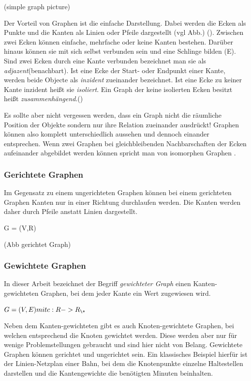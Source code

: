 \documentclass[10pt,a4paper]{article}
\begin{document}
(simple graph picture)

Der Vorteil von Graphen ist die einfache Darstellung. Dabei werden die Ecken als Punkte und die Kanten als Linien oder Pfeile dargestellt (vgl Abb.) (\cite[49]{kurt}). Zwischen zwei Ecken können einfache, mehrfache oder keine Kanten bestehen. Darüber hinaus können sie mit sich selbst verbunden sein und eine Schlinge bilden (E). Sind zwei Ecken durch eine Kante verbunden bezeichnet man sie als \textit{adjazent}(benachbart). Ist eine Ecke der Start- oder Endpunkt einer Kante, werden beide Objecte als \textit{inzident} zueinander bezeichnet. Ist eine Ecke zu keiner Kante inzident heißt sie \textit{isoliert}. Ein Graph der keine isolierten Ecken besitzt heißt \textit{zusammenhängend}.(\cite[4f]{theory})

Es sollte aber nicht vergessen werden, dass ein Graph nicht die räumliche Position der Objekte sondern nur ihre Relation zueinander ausdrückt! Graphen können also komplett unterschiedlich aussehen und dennoch einander entsprechen. Wenn zwei Graphen bei gleichbleibenden Nachbarschaften der Ecken aufeinander abgebildet werden können spricht man von isomorphen Graphen \cite[106]{theory}.

\subsubsection{Gerichtete Graphen}
Im Gegensatz zu einem ungerichteten Graphen können bei einem gerichteten Graphen Kanten nur in einer Richtung durchlaufen werden. Die Kanten werden daher durch Pfeile anstatt Linien dargestellt.

G = (V,R)

(Abb gerichtet Graph)

\subsubsection{Gewichtete Graphen}
In dieser Arbeit bezeichnet der Begriff \textit{gewichteter Graph} einen Kanten-gewichteten Graphen, bei dem jeder Kante ein Wert zugewiesen wird.

$G = (V,E) mit c: R -> R_{\+}$

Neben dem Kanten-gewichteten gibt es auch Knoten-gewichtete Graphen, bei welchen entsprechend die Knoten gewichtet werden. Diese werden aber nur für wenige Problemstellungen gebraucht und sind hier nicht von Belang. Gewichtete Graphen können gerichtet und ungerichtet sein. Ein klassisches Beispiel hierfür ist der Linien-Netzplan einer Bahn, bei dem die Knotenpunkte einzelne Haltestellen darstellen und die Kantengewichte die benötigten Minuten beinhalten.
\end{document}
